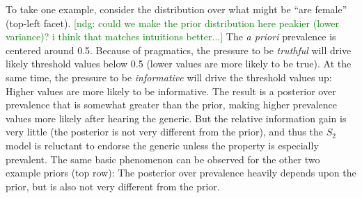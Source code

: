 \documentclass[12pt,letterpaper]{article}
\newcommand{\ndg}[1]{\textcolor{Green}{[ndg: #1]}}
\begin{document}
To take one example, consider the distribution over what might be ``are female'' (top-left facet).
\ndg{could we make the prior distribution here peakier (lower variance)? i think that matches intuitions better...}
The \emph{a priori} prevalence is centered around 0.5.
Because of pragmatics, the pressure to be \emph{truthful} will drive likely threshold values below 0.5 (lower values are more likely to be true). 
At the same time, the pressure to be \emph{informative} will drive the threshold values up: Higher values are more likely to be informative. 
The result is a posterior over prevalence that is somewhat greater than the prior, making higher prevalence values more likely after hearing the generic. 
But the relative information gain is very little (the posterior is not very different from the prior), and thus the $S_2$ model is reluctant to endorse the generic unless the property is especially prevalent. 
The same basic phenomenon can be observed for the other two example priors (top row): The posterior over prevalence heavily depends upon the prior, but is also not very different from the prior. %

%
\end{document}
